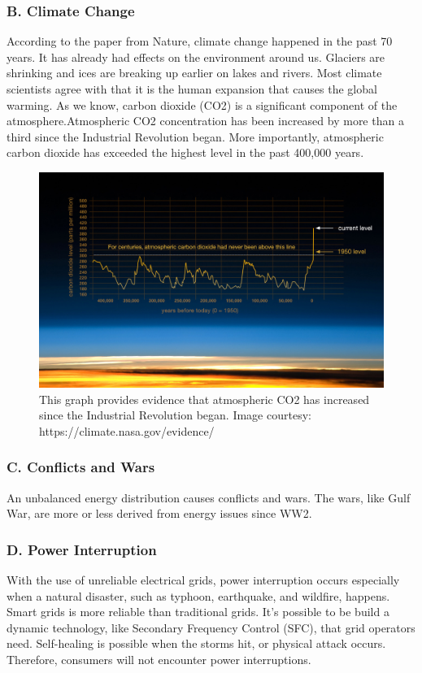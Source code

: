 \documentclass{report}
\begin{document}
\subsubsection{B. Climate Change}
According to the paper from Nature, climate change happened in the past 70 years. It has already had effects on the environment around us. Glaciers are shrinking and ices are breaking up earlier on lakes and rivers. Most climate scientists agree with that it is the human expansion that causes the global warming. As we know, carbon dioxide (CO2) is a significant component of the atmosphere.Atmospheric CO2 concentration has been increased by more than a third since the Industrial Revolution began. More importantly, atmospheric carbon dioxide has exceeded the highest level in the past 400,000 years.\\

\begin{figure}
\centering
\includegraphics[width = .999\textwidth]{Figure/nasa_co2.jpeg}
\caption{This graph provides evidence that atmospheric CO2 has increased since the Industrial Revolution began. Image courtesy: https://climate.nasa.gov/evidence/}
\label{nasa_co2}
\end{figure}

\subsubsection{C. Conflicts and Wars}
An unbalanced energy distribution causes conflicts and wars. The wars, like Gulf War, are more or less derived from energy issues since WW2.\\

\subsubsection{D. Power Interruption}
With the use of unreliable electrical grids, power interruption occurs especially when a natural disaster, such as typhoon, earthquake, and wildfire, happens. Smart grids is more reliable than traditional grids. It’s possible to be build a dynamic technology, like Secondary Frequency Control (SFC), that grid operators need. Self-healing is possible when the storms hit, or physical attack occurs. Therefore, consumers will not encounter power interruptions.\\
\end{document}
